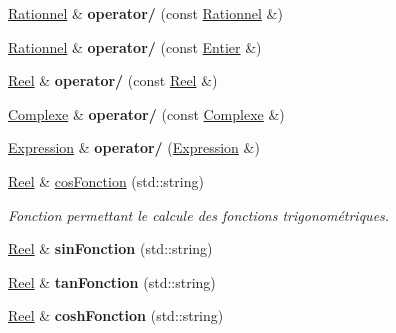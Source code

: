 \begin{DoxyCompactItemize}
\item 
\hypertarget{class_rationnel_a46096b527c86302dd2ee60efb8e4487c}{\hyperlink{class_rationnel}{Rationnel} \& {\bfseries operator/} (const \hyperlink{class_rationnel}{Rationnel} \&)}\label{class_rationnel_a46096b527c86302dd2ee60efb8e4487c}

\item 
\hypertarget{class_rationnel_aa92c16294435def61b2d785390797aae}{\hyperlink{class_rationnel}{Rationnel} \& {\bfseries operator/} (const \hyperlink{class_entier}{Entier} \&)}\label{class_rationnel_aa92c16294435def61b2d785390797aae}

\item 
\hypertarget{class_rationnel_a6c76b819c144a6585c21975e3eac9081}{\hyperlink{class_reel}{Reel} \& {\bfseries operator/} (const \hyperlink{class_reel}{Reel} \&)}\label{class_rationnel_a6c76b819c144a6585c21975e3eac9081}

\item 
\hypertarget{class_rationnel_a30ba8e1bb4559b379a9f50a5ebae90df}{\hyperlink{class_complexe}{Complexe} \& {\bfseries operator/} (const \hyperlink{class_complexe}{Complexe} \&)}\label{class_rationnel_a30ba8e1bb4559b379a9f50a5ebae90df}

\item 
\hypertarget{class_rationnel_a2b6c1a1c27d9fdc38637c28952ba61da}{\hyperlink{class_expression}{Expression} \& {\bfseries operator/} (\hyperlink{class_expression}{Expression} \&)}\label{class_rationnel_a2b6c1a1c27d9fdc38637c28952ba61da}

\item 
\hyperlink{class_reel}{Reel} \& \hyperlink{class_rationnel_a0bfb204ddbbfa0b81db8d3b5fe46bdfa}{cos\-Fonction} (std\-::string)
\begin{DoxyCompactList}\small\item\em Fonction permettant le calcule des fonctions trigonométriques. \end{DoxyCompactList}\item 
\hypertarget{class_rationnel_aebacb17c977f3313382ace02c2d8b90c}{\hyperlink{class_reel}{Reel} \& {\bfseries sin\-Fonction} (std\-::string)}\label{class_rationnel_aebacb17c977f3313382ace02c2d8b90c}

\item 
\hypertarget{class_rationnel_ad9cec0750c868180c40fb95f6d21a2da}{\hyperlink{class_reel}{Reel} \& {\bfseries tan\-Fonction} (std\-::string)}\label{class_rationnel_ad9cec0750c868180c40fb95f6d21a2da}

\item 
\hypertarget{class_rationnel_a6c57e93663ba26c2e134bc14bb43eb6c}{\hyperlink{class_reel}{Reel} \& {\bfseries cosh\-Fonction} (std\-::string)}\label{class_rationnel_a6c57e93663ba26c2e134bc14bb43eb6c}


\end{DoxyCompactItemize}
